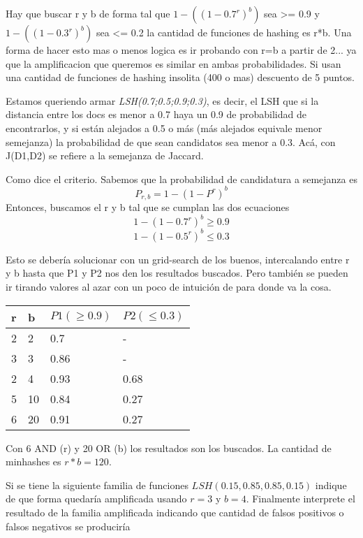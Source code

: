 \documentclass[a4paper]{article}
\newenvironment{enunciado}[3]{%
    \vspace{\baselineskip}
    \tcolorbox[beamer,%
    noparskip,breakable,
    colback=LightGreen,colframe=DarkGreen,%
    colbacklower=LimeGreen!75!LightGreen,%
    title=\small Enunciado: Año #1\, Cuatrimestre #2\, Oportunidad #3]}%
    {\endtcolorbox}
\newenvironment{criterio}[3]{%
    \tcolorbox[beamer,%
    noparskip,breakable,
    colback=LightCoral,colframe=DarkRed,%
    colbacklower=Tomato!75!LightCoral,%
    title=\small Criterio de Corrección: Año #1\, Cuatrimestre #2\, Oportunidad #3]}%
    {\endtcolorbox}
\begin{document}
    \begin{criterio}{2014}{1}{1}
        Hay que buscar r y b de forma tal que $1 - ((1-0.7^r)^b)$ sea >= 0.9 y $1-((1-0.3^r)^b)$ sea <= 0.2 la cantidad de funciones de hashing es r*b. Una forma de hacer esto mas o menos logica es ir probando con r=b a partir de 2... ya que la amplificacion que queremos es similar en ambas probabilidades. Si usan una cantidad de funciones de hashing insolita (400 o mas) descuento de 5 puntos. 
    \end{criterio}

    Estamos queriendo armar \textit{LSH(0.7;0.5;0.9;0.3)}, es decir, el LSH que si la distancia entre los docs es menor a 0.7 haya un 0.9 de probabilidad de encontrarlos, y si están alejados a 0.5 o más (más alejados equivale menor semejanza) la probabilidad de que sean candidatos sea menor a 0.3. Acá, con J(D1,D2) se refiere a la semejanza de Jaccard.
    
    Como dice el criterio. Sabemos que la probabilidad de candidatura a semejanza es $$P_{r,b} = 1 - (1 - P^r)^b$$ Entonces, buscamos el r y b tal que se cumplan las dos ecuaciones $$1 - (1 - 0.7^r)^b \geq 0.9$$ $$1 - (1 - 0.5^r)^b \leq 0.3$$

    Esto se debería solucionar con un grid-search de los buenos, intercalando entre r y b hasta que P1 y P2 nos den los resultados buscados. Pero también se pueden ir tirando valores al azar con un poco de intuición de para donde va la cosa.  

    \begin{table}[H]
        \begin{tabular}{|l|l|l|l|}
        \hline
        r & b  & $P1 (\geq 0.9)$   & $P2 (\leq 0.3)$   \\
        \hline
        2 & 2  & 0.7  & -    \\
        3 & 3  & 0.86 & -    \\
        2 & 4  & 0.93 & 0.68    \\
        5 & 10 & 0.84 & 0.27 \\
        6 & 20 & 0.91 & 0.27 \\
        \hline
        \end{tabular}
    \end{table}

    Con 6 AND (r) y 20 OR (b) los resultados son los buscados. La cantidad de minhashes es $r*b=120$.

    \begin{enunciado}{2014}{2}{1}
        Si   se   tiene   la   siguiente   familia   de   funciones     $LSH(0.15,0.85,0.85,0.15)$   indique   de   que   forma   quedaría amplificada   usando   $r=3$   y   $b=4$.   Finalmente   interprete   el resultado de la familia amplificada indicando que cantidad de falsos  positivos  o falsos  negativos  se produciría
    \end{enunciado}
\end{document}
